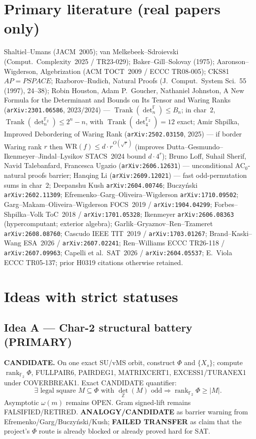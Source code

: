 \documentclass[11pt]{article}
\begin{document}
\section*{Primary literature (real papers only)}
Shaltiel--Umans (JACM~2005); van Melkebeek--Sdroievski (Comput.\ Complexity~2025 /
TR23-029); Baker--Gill--Solovay (1975); Aaronson--Wigderson, Algebrization
(ACM TOCT~2009 / ECCC TR08-005); CKS81 $AP=PSPACE$; Razborov--Rudich, Natural
Proofs (J.\ Comput.\ System Sci.\ 55 (1997), 24--38);
Robin Houston, Adam P.\ Goucher, Nathaniel Johnston, A New Formula for the
Determinant and Bounds on Its Tensor and Waring Ranks
(\texttt{arXiv:2301.06586}, 2023/2024) --- $\operatorname{Trank}(\det_n^{\mathbb F})\le B_n$;
in char~$2$, $\operatorname{Trank}(\det_n^{\mathbb F_2})\le 2^n-n$, with
$\operatorname{Trank}(\det_4^{\mathbb F_2})=12$ exact;
Amir Shpilka, Improved Debordering of Waring Rank
(\texttt{arXiv:2502.03150}, 2025) --- if border Waring rank $r$ then
$\mathrm{WR}(f)\le d\cdot r^{O(\sqrt r)}$ (improves Dutta--Gesmundo--Ikenmeyer--Jindal--Lysikov
STACS~2024 bound $d\cdot 4^r$);
Bruno Loff, Suhail Sherif, Navid Talebanfard, Francesca Ugazio
(\texttt{arXiv:2606.12631}) --- unconditional AC$_0$-natural proofs barrier;
Hanqing Li (\texttt{arXiv:2609.12021}) --- fast odd-permutation sums in char~$2$;
Deepanshu Kush \texttt{arXiv:2604.00746}; Buczy\'nski \texttt{arXiv:2602.11309};
Efremenko--Garg--Oliveira--Wigderson \texttt{arXiv:1710.09502};
Garg--Makam--Oliveira--Wigderson FOCS~2019 / \texttt{arXiv:1904.04299};
Forbes--Shpilka--Volk ToC~2018 / \texttt{arXiv:1701.05328};
Ikenmeyer \texttt{arXiv:2606.08363} (hypercomputant; exterior algebra);
Garlik--Gryaznov--Ren--Tzameret \texttt{arXiv:2608.08760};
Cascudo IEEE TIT~2019 / \texttt{arXiv:1703.01267};
Brand--Kaski--Wang ESA~2026 / \texttt{arXiv:2607.02241};
Ren--Williams ECCC TR26-118 / \texttt{arXiv:2607.09963};
Capelli et al.\ SAT~2026 / \texttt{arXiv:2604.05537};
E.\ Viola ECCC TR05-137; prior H0319 citations otherwise retained.

\section*{Ideas with strict statuses}
\subsection*{Idea A --- Char-2 structural battery (PRIMARY)}
\textbf{CANDIDATE.} On one exact SU/vMS orbit, construct $\Phi$ and $\{X_s\}$;
compute $\operatorname{rank}_{\mathbb F_2}\Phi$, FULLPAIR6, PAIRDEG1, MATRIXCERT1,
EXCESS1/TURANEX1 under COVERBREAK1. Exact CANDIDATE quantifier:
\[
\exists\text{ legal square }M\subseteq\Phi\text{ with }\det_{\mathbb Z}(M)\text{ odd}
\Rightarrow\operatorname{rank}_{\mathbb F_2}\Phi\ge|M|.
\]
Asymptotic $\omega(m)$ remains OPEN. Gram signed-lift remains FALSIFIED/RETIRED.
\textbf{ANALOGY/CANDIDATE} as barrier warning from Efremenko/Garg/Buczy\'nski/Kush;
\textbf{FAILED TRANSFER} as claim that the project's $\Phi$ route is already
blocked or already proved hard for SAT.
\end{document}

